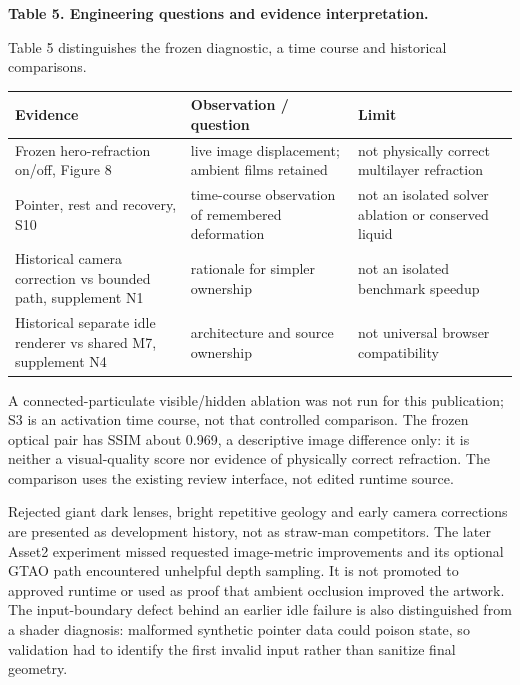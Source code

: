 \documentclass[
  english,
  11pt,
]{article}
\newcounter{none} %
\begin{document}
\textbf{Table 5. Engineering questions and evidence interpretation.}

Table 5 distinguishes the frozen diagnostic, a time course and
historical comparisons.

{\def\LTcaptype{none} %
\begin{longtable}[]{@{}
  >{\raggedright\arraybackslash}p{}
  >{\raggedright\arraybackslash}p{}
  >{\raggedright\arraybackslash}p{}@{}}
\toprule\noalign{}
\begin{minipage}[b]{\linewidth}\raggedright
Evidence
\end{minipage} & \begin{minipage}[b]{\linewidth}\raggedright
Observation / question
\end{minipage} & \begin{minipage}[b]{\linewidth}\raggedright
Limit
\end{minipage} \\
\midrule\noalign{}
\endhead
\bottomrule\noalign{}
\endlastfoot
Frozen hero-refraction on/off, Figure 8 & live image displacement;
ambient films retained & not physically correct multilayer refraction \\
Pointer, rest and recovery, S10 & time-course observation of remembered
deformation & not an isolated solver ablation or conserved liquid \\
Historical camera correction vs bounded path, supplement N1 & rationale
for simpler ownership & not an isolated benchmark speedup \\
Historical separate idle renderer vs shared M7, supplement N4 &
architecture and source ownership & not universal browser
compatibility \\
\end{longtable}
}

A connected-particulate visible/hidden ablation was not run for this
publication; S3 is an activation time course, not that controlled
comparison. The frozen optical pair has SSIM about 0.969, a descriptive
image difference only: it is neither a visual-quality score nor evidence
of physically correct refraction. The comparison uses the existing
review interface, not edited runtime source.

Rejected giant dark lenses, bright repetitive geology and early camera
corrections are presented as development history, not as straw-man
competitors. The later Asset2 experiment missed requested image-metric
improvements and its optional GTAO path encountered unhelpful depth
sampling. It is not promoted to approved runtime or used as proof that
ambient occlusion improved the artwork. The input-boundary defect behind
an earlier idle failure is also distinguished from a shader diagnosis:
malformed synthetic pointer data could poison state, so validation had
to identify the first invalid input rather than sanitize final geometry.
\end{document}
